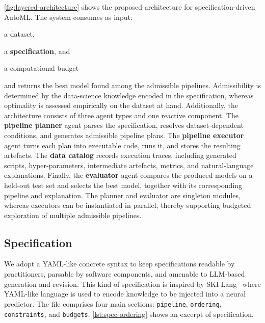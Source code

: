 \documentclass[runningheads]{llncs}
\newenvironment{inlinelist}{\begin{enumerate*}[label=\emph{(\roman*)}]}{\end{enumerate*}}
\begin{document}
\cref{fig:layered-architecture} shows the proposed architecture for specification-driven \ac{AutoML}.
%
The system consumes as input:
\begin{inlinelist}
  \item a dataset,
  \item a \textbf{specification}, %
  and
  \item a computational budget
\end{inlinelist}
and returns the best model found among the admissible pipelines.
%
Admissibility is determined by the data-science knowledge encoded in the specification,
whereas optimality is assessed empirically on the dataset at hand.
%
Additionally, the architecture consists of three agent types and one reactive component.
%
The \textbf{pipeline planner} agent parses the specification,
resolves dataset-dependent conditions,
and generates admissible pipeline plans.
%
The \textbf{pipeline executor} agent turns each plan into executable code,
runs it,
and stores the resulting artefacts.
%
The \textbf{data catalog} records execution traces,
including generated scripts,
hyper-parameters,
intermediate artefacts,
metrics,
and natural-language explanations.
%
Finally,
the \textbf{evaluator} agent compares the produced models on a held-out test set
and selects the best model,
together with its corresponding pipeline and explanation.
%
The planner and evaluator are singleton modules,
whereas executors can be instantiated in parallel,
thereby supporting budgeted exploration of multiple admissible pipelines.

\subsection{Specification}
\label{subsec:specification}

We adopt a YAML-like concrete syntax to keep specifications readable by practitioners,
parsable by software components,
and
amenable to \ac{LLM}-based generation and revision.
%
This kind of specification is inspired by SKI-Lang~\cite{skilang}
where YAML-like language is used to encode knowledge to be injected into a neural predictor.
%
The file comprises four main sections:
\texttt{pipeline},
\texttt{ordering},
\texttt{constraints},
and
\texttt{budgets}.
\cref{lst:spec-ordering} shows an excerpt of specification.
\end{document}
